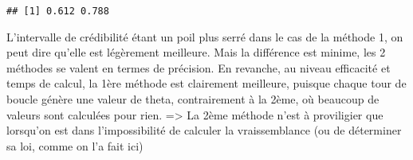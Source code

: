 \documentclass[]{article}
\begin{document}
\begin{verbatim}
## [1] 0.612 0.788
\end{verbatim}

L'intervalle de crédibilité étant un poil plus serré dans le cas de la
méthode 1, on peut dire qu'elle est légèrement meilleure. Mais la
différence est minime, les 2 méthodes se valent en termes de précision.
En revanche, au niveau efficacité et temps de calcul, la 1ère méthode
est clairement meilleure, puisque chaque tour de boucle génère une
valeur de theta, contrairement à la 2ème, où beaucoup de valeurs sont
calculées pour rien. =\textgreater{} La 2ème méthode n'est à proviligier
que lorsqu'on est dans l'impossibilité de calculer la vraissemblance (ou
de déterminer sa loi, comme on l'a fait ici)
\end{document}
